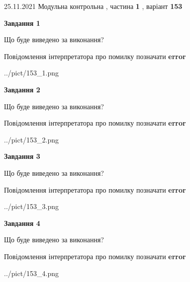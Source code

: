 \documentclass[10pt, ukrainian]{article}
\begin{document}
{25.11.2021 Модульна контрольна , частина \textbf { 1 }, варіант  \No \textbf { 153 }\par}
{
\begin {large}

{\begin {center}\textbf{Завдання 1}\end {center}}\par
Що буде виведено за виконання? \par
Повідомлення інтерпретатора про помилку позначати \textbf{error}

\begin{center}
	{../pict/153_1.png}
\end{center}
\newpage

{\begin {center}\textbf{Завдання 2}\end {center}}\par
Що буде виведено за виконання? \par
Повідомлення інтерпретатора про помилку позначати \textbf{error}

\begin{center}
	{../pict/153_2.png}
\end{center}
\newpage

{\begin {center}\textbf{Завдання 3}\end {center}}\par
Що буде виведено за виконання? \par
Повідомлення інтерпретатора про помилку позначати \textbf{error}

\begin{center}
	{../pict/153_3.png}
\end{center}
\newpage

{\begin {center}\textbf{Завдання 4}\end {center}}\par
Що буде виведено за виконання? \par
Повідомлення інтерпретатора про помилку позначати \textbf{error}

\begin{center}
	{../pict/153_4.png}
\end{center}
\newpage


\end{large}}
\end{document}
